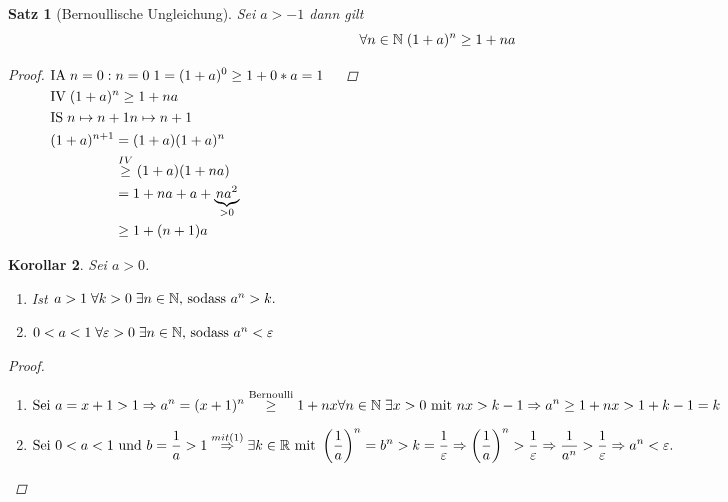 \documentclass[a4paper,titlepage,oneside]{article}
\def\N{\ensuremath{\mathbb{N}} }
\def\R{\ensuremath{\mathbb{R}} }
\renewcommand{\epsilon}{\ensuremath{\varepsilon}}
\newcommand{\IA}[1][n=0]{\vspace{0.1pt}\ensuremath{\text{IA}\sp#1:}}
\newcommand{\IV}{\vspace{0.1pt}\ensuremath{\text{IV}\sp}}
\newcommand{\IS}[1][n \mapsto n+1]{\vspace{0.1pt}\ensuremath{\text{IS}\sp#1}}
\def\fa{\ensuremath{\forall}}
\def\sp{\hspace{0,1cm}}
\theoremstyle{thmstyle}
\newtheorem{satz}{Satz}[subsection]
\newtheorem{korr}[satz]{Korollar}
\begin{document}
\begin{satz}[Bernoullische Ungleichung]
Sei \(a > -1\) dann gilt \[\fa n \in \N \sp (1+a)^n \ge 1 + na \]
\begin{proof}
\begin{math}
\begin{aligned}[t]
	&\IA{n=0} \sp 1 = (1 + a)^0 \ge 1 + 0*a = 1					&&\\
	&\IV (1+a)^n \ge 1 + na								&&\\
	&\IS{n \mapsto n+1} \\ 
	&\begin{aligned}[t]
		(1+a)^{n+1} 	&= (1+a)(1+a)^n 					&&\\
					&\overset{IV}{\ge} (1 + a)(1 + na) 		&&\\
					&= 1 + na + a + \underbrace{na^2}_{> 0} 	&&\\
					&\ge 1 + (n+1)a \end{aligned}
\end{aligned}
\end{math}
\newline
\end{proof}
\end{satz}
\newpage

\begin{korr}
Sei \(a > 0\).
\begin{enumerate}[label=(\arabic*)]
	\item Ist \sp \(a > 1 \sp \forall k > 0 \sp \exists n \in \N \text{, sodass }a^n > k.\)
	\item \(0 < a < 1 \sp \forall \epsilon > 0 \sp \exists n \in \N \text{, sodass }a^n < \epsilon\)
\end{enumerate}
\begin{proof}\sp
\begin{enumerate}[label=(\arabic*)]
	\item \begin{math} \displaystyle
		\text{Sei } a = x + 1 > 1 \Rightarrow a^n = (x + 1)^n \overset{\text{Bernoulli}}{\ge} 1 + nx \\
		\forall n \in \N \sp \exists x > 0 \text{ mit } nx > k - 1 \Rightarrow a^n \ge 1 + nx > 1 + k -1 = k 
		\end{math}
	\item \begin{math} \displaystyle
		\text{Sei } 0 < a < 1 \text{ und } b = \frac{1}{a} > 1 \overset{\tiny{mit (1)}}{\Rightarrow} \exists k \in \R \text{ mit }  \left(\frac{1}{a}\right)^n = b^n > k = \frac{1}{\epsilon}\\
		\Rightarrow  \left(\frac{1}{a}\right)^n > \frac{1}{\epsilon} \Rightarrow  \frac{1}{a^n} > \frac{1}{\epsilon} \Rightarrow a^n < \epsilon.
		\end{math}
\end{enumerate}
\end{proof}
\end{korr}
\end{document}
